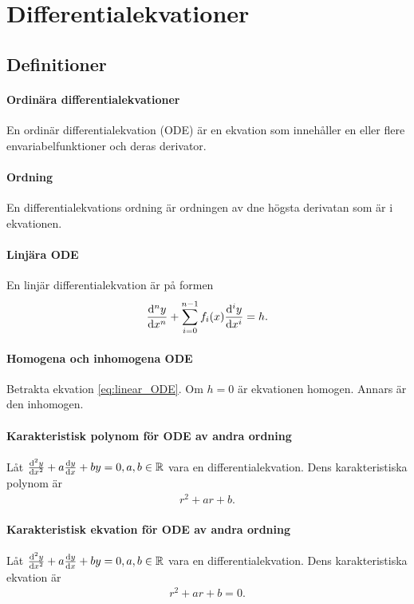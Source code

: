 \section{Differentialekvationer}

\subsection{Definitioner}

\paragraph{Ordinära differentialekvationer}
En ordinär differentialekvation (ODE) är en ekvation som innehåller en eller flere envariabelfunktioner och deras derivator.

\paragraph{Ordning}
En differentialekvations ordning är ordningen av dne högsta derivatan som är i ekvationen.

\paragraph{Linjära ODE}
En linjär differentialekvation är på formen
\begin{align}
	\dv[n]{y}{x} + \sum\limits_{i = 0}^{n - 1}f_i(x)\dv[i]{y}{x} = h.
	\label{eq:linear_ODE}
\end{align}

\paragraph{Homogena och inhomogena ODE}
Betrakta ekvation \ref{eq:linear_ODE}. Om $h = 0$ är ekvationen homogen. Annars är den inhomogen.

\paragraph{Karakteristisk polynom för ODE av andra ordning}
Låt $\dv[2]{y}{x} + a\dv{y}{x} + by = 0, a, b\in\mathbb{R}$ vara en differentialekvation. Dens karakteristiska polynom är
\begin{align*}
	r^2 + ar + b.
\end{align*}

\paragraph{Karakteristisk ekvation för ODE av andra ordning}
Låt $\dv[2]{y}{x} + a\dv{y}{x} + by = 0, a, b\in\mathbb{R}$ vara en differentialekvation. Dens karakteristiska ekvation är
\begin{align*}
	r^2 + ar + b = 0.
\end{align*}

